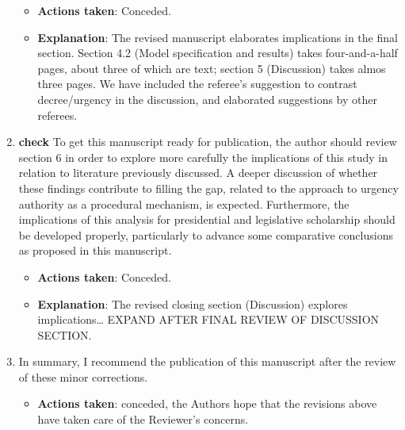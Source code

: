 \documentclass[article,letterpaper,times,12pt,listings-bw,microtype]{article}
\begin{document}
\begin{enumerate}
\label{sec:orgb13192f}
\begin{itemize}
\item \textbf{Actions taken}: Conceded.
\item \textbf{Explanation}: The revised manuscript elaborates implications in the final section. Section 4.2 (Model specification and results) takes four-and-a-half pages, about three of which are text; section 5 (Discussion) takes almos three pages. We have included the referee's suggestion to contrast decree/urgency in the discussion, and elaborated suggestions by other referees.
\end{itemize}
\item \textbf{check} To get this manuscript ready for publication, the author should review section 6 in order to explore more carefully the implications of this study in relation to literature previously discussed. A deeper discussion of whether these findings contribute to filling the gap, related to the approach to urgency authority as a procedural mechanism, is expected. Furthermore, the implications of this analysis for presidential and legislative scholarship should be developed properly, particularly to advance some comparative conclusions as proposed in this manuscript.
\label{sec:orga4aa713}
\begin{itemize}
\item \textbf{Actions taken}: Conceded.
\item \textbf{Explanation}: The revised closing section (Discussion) explores implications\ldots{} EXPAND AFTER FINAL REVIEW OF DISCUSSION SECTION.
\end{itemize}
\item In summary, I recommend the publication of this manuscript after the review of these minor corrections.
\label{sec:orgfdc2c4f}
\begin{itemize}
\item \textbf{Actions taken}: conceded, the Authors hope that the revisions above have taken care of the Reviewer's concerns.
\end{itemize}
\end{enumerate}
\end{document}
